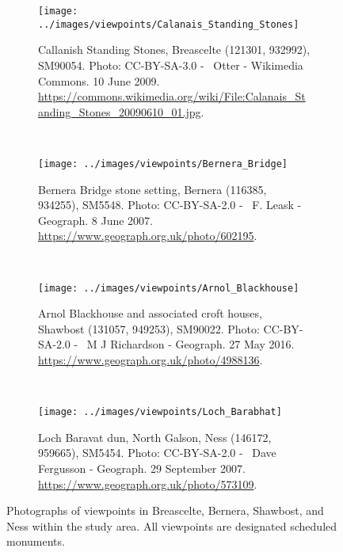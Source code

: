 \begin{figure}
  \centering
  \begin{subfigure}[t]{.48\textwidth}
    \texttt{[image: ../images/viewpoints/Calanais\_Standing\_Stones]}
    \caption*{Callanish Standing Stones, Breascelte (121301, 932992), SM90054. Photo: CC-BY-SA-3.0 - \textcopyright~Otter - Wikimedia Commons. 10 June 2009. \url{https://commons.wikimedia.org/wiki/File:Calanais_Standing_Stones_20090610_01.jpg}.}
  \end{subfigure}
  ~
  \begin{subfigure}[t]{.48\textwidth}
    \texttt{[image: ../images/viewpoints/Bernera\_Bridge]}
    \caption*{Bernera Bridge stone setting, Bernera (116385, 934255), SM5548. Photo: CC-BY-SA-2.0 - \textcopyright~F. Leask - Geograph. 8 June 2007. \url{https://www.geograph.org.uk/photo/602195}.}
  \end{subfigure}
  \\[.5cm]
  \begin{subfigure}[t]{.48\textwidth}
    \texttt{[image: ../images/viewpoints/Arnol\_Blackhouse]}
    \caption*{Arnol Blackhouse and associated croft houses, Shawbost (131057, 949253), SM90022. Photo: CC-BY-SA-2.0 - \textcopyright~M J Richardson - Geograph. 27 May 2016. \url{https://www.geograph.org.uk/photo/4988136}.}
  \end{subfigure}
  ~
  \begin{subfigure}[t]{.48\textwidth}
    \texttt{[image: ../images/viewpoints/Loch\_Barabhat]}
    \caption*{Loch Baravat dun, North Galson, Ness (146172, 959665), SM5454. Photo: CC-BY-SA-2.0 - \textcopyright~Dave Fergusson - Geograph. 29 September 2007. \url{https://www.geograph.org.uk/photo/573109}.}
  \end{subfigure}
  \caption{Photographs of viewpoints in Breascelte, Bernera, Shawbost, and Ness within the study area. All viewpoints are designated scheduled monuments. \label{fig:viewpoints1}}
\end{figure}

